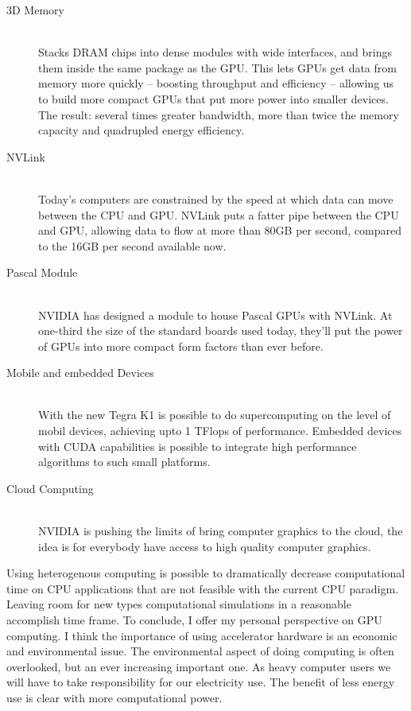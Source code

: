 \begin{description}
  \item[3D Memory] \hfill \\
 Stacks DRAM chips into dense modules with wide interfaces, and brings them inside the same package as the GPU. This lets GPUs get data from memory more quickly – boosting throughput and efficiency – allowing us to build more compact GPUs that put more power into smaller devices. The result: several times greater bandwidth, more than twice the memory capacity and quadrupled energy efficiency.
  
  \item[NVLink] \hfill \\
 Today’s computers are constrained by the speed at which data can move between the CPU and GPU. NVLink puts a fatter pipe between the CPU and GPU, allowing data to flow at more than 80GB per second, compared to the 16GB per second available now.
 
 \item[Pascal Module] \hfill \\ 
  NVIDIA has designed a module to house Pascal GPUs with NVLink. At one-third the size of the standard boards used today, they’ll put the power of GPUs into more compact form factors than ever before.
  
   \item[Mobile and embedded Devices] \hfill \\ 
   With the new Tegra K1 is possible to do supercomputing on the level of mobil devices, achieving upto 1 TFlops of performance. Embedded devices with CUDA capabilities is possible to integrate high performance algorithms to such small platforms. 
   \item[Cloud Computing] \hfill \\ 
   NVIDIA is pushing the limits of bring computer graphics to the cloud, the idea is for everybody have access to high quality computer graphics.
 
  \end{description}
  
\vspace{2.5em}


Using heterogenous computing is possible to dramatically decrease computational time on CPU applications that are not feasible with the current CPU paradigm. Leaving room for new types computational simulations in a reasonable accomplish time frame.  
To conclude, I offer my personal perspective on GPU computing. I think the importance of using accelerator hardware is an economic and environmental issue. The environmental aspect of doing computing is often overlooked, but an ever increasing important one. As heavy computer users we will have to take responsibility for our electricity use. The benefit of less energy use is clear with more computational power. 
